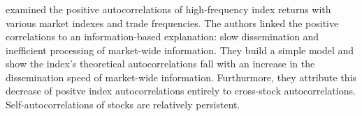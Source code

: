 \subsubsection{\citet{froot1995new}}\label{chap1:sec2:ssec2:paper2}
\citet{froot1995new} examined the positive autocorrelations of high-frequency index returns with various market indexes and trade frequencies. The authors linked the positive correlations to an information-based explanation: slow dissemination
and inefficient processing of market-wide information. They build a simple model and show the index's theoretical autocorrelations fall with an increase in the dissemination speed of market-wide information. Furthurmore, they attribute this
decrease of positve index autocorrelations entirely to cross-stock autocorrelations. Self-autocorrelations of stocks are relatively persistent.

